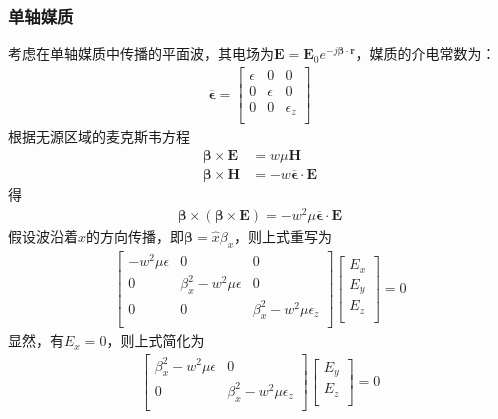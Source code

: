 \documentclass{article}
\numberwithin{equation}{section}
\renewcommand{\vec}[1]{\boldsymbol{#1}}
\begin{document}
\subsubsection{单轴媒质}
考虑在单轴媒质中传播的平面波，其电场为$\mathbf{E}=\mathbf{E}_0e^{-j\vec{\beta}\cdot\vec{r}}$，媒质的介电常数为：
\begin{align}
    \label{eq:eq453}
    \overline{\vec{\epsilon}}=
        \left[
            \begin{matrix}
                \epsilon & 0 & 0 \\
                0 & \epsilon & 0 \\
                0 & 0 & \epsilon_z \\
            \end{matrix}
        \right]
\end{align}
根据无源区域的麦克斯韦方程
\begin{align}
    \label{eq:eq454}
    \vec{\beta}\times\mathbf{E}&=w\mu\mathbf{H} \\
    \label{eq:eq455}
    \vec{\beta}\times\mathbf{H}&=-w\overline{\vec{\epsilon}}\cdot\mathbf{E}
\end{align}
得
\begin{align}
    \label{eq:eq456}
    \vec{\beta}\times(\vec{\beta}\times\mathbf{E})=-w^2\mu\overline{\vec{\epsilon}}\cdot\mathbf{E}
\end{align}
假设波沿着$x$的方向传播，即$\vec{\beta}=\hat{x}\beta_x$，则上式重写为
\begin{align}
    \label{eq:eq457}
    \left[
        \begin{matrix}
            -w^2\mu\epsilon & 0 & 0 \\
            0 & \beta_x^2-w^2\mu\epsilon & 0 \\
            0 & 0 & \beta_x^2-w^2\mu\epsilon_z \\
        \end{matrix}
    \right]
    \left[
        \begin{matrix}
            E_x \\
            E_y \\
            E_z \\
        \end{matrix}
    \right]=0
\end{align}
显然，有$E_x=0$，则上式简化为
\begin{align}
    \label{eq:eq458}
    \left[
        \begin{matrix}
            \beta_x^2-w^2\mu\epsilon & 0 \\
            0 & \beta_x^2-w^2\mu\epsilon_z \\
        \end{matrix}
    \right]
    \left[
        \begin{matrix}
            E_y \\
            E_z \\
        \end{matrix}
    \right]=0
\end{align}
\end{document}
